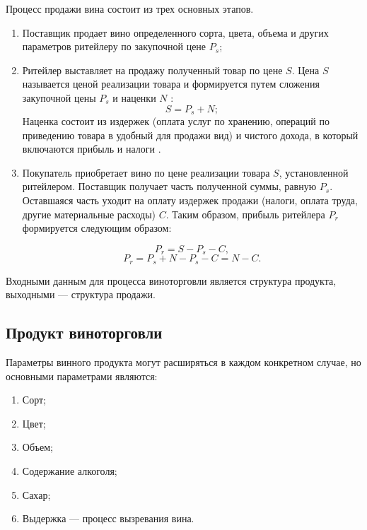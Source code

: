 Процесс продажи вина состоит из трех основных этапов.

\begin{enumerate}
	\item Поставщик продает вино определенного сорта, цвета, объема и других параметров ритейлеру по закупочной цене $P_{s}$;
	\item Ритейлер выставляет на продажу полученный товар по цене $S$. Цена $S$ называется ценой реализации товара и формируется путем сложения закупочной цены $P_{s}$ и наценки $N$ \cite{pricing}:
\begin{equation}
    S = P_{s} + N;
\end{equation}
Наценка состоит из издержек (оплата услуг по хранению, операций по приведению товара в удобный для продажи вид) и чистого дохода, в который включаются прибыль и налоги \cite{pricing}. 
	\item Покупатель приобретает вино по цене реализации товара $S$, установленной ритейлером. Поставщик получает часть полученной суммы, равную $P_{s}$. Оставшаяся часть уходит на оплату издержек продажи (налоги, оплата труда, другие материальные расходы) $C$. Таким образом, прибыль ритейлера $P_{r}$ формируется следующим образом:
	
\begin{equation}
    P_{r} = S - P_{s} - C,
\end{equation}
\begin{equation}
    P_{r} = P_{s} + N - P_{s} - C = N - C.
\end{equation}
\end{enumerate}

Входными данным для процесса виноторговли является структура продукта, выходными --- структура продажи.

\subsection{Продукт виноторговли}

Параметры винного продукта могут расширяться в каждом конкретном случае, но основными параметрами являются:

\begin{enumerate}
	\item Сорт;
	\item Цвет;
	\item Объем;
	\item Содержание алкоголя;
	\item Сахар;
	\item Выдержка --- процесс вызревания вина.
\end{enumerate}

